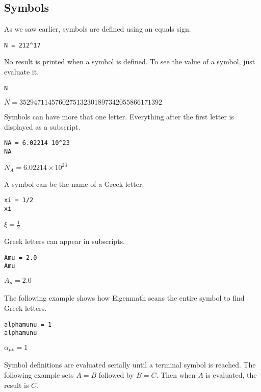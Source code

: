 \subsection{Symbols}

As we saw earlier, symbols are defined using an equals sign.

\begin{Verbatim}[formatcom=\color{blue}]
N = 212^17
\end{Verbatim}

\noindent
No result is printed when a symbol is defined.
To see the value of a symbol, just evaluate it.

\begin{Verbatim}[formatcom=\color{blue}]
N
\end{Verbatim}

\noindent
$\displaystyle N=3529471145760275132301897342055866171392$

\bigskip
\noindent
Symbols can have more that one letter.
Everything after the first letter is displayed as a subscript.

\begin{Verbatim}[formatcom=\color{blue}]
NA = 6.02214 10^23
NA
\end{Verbatim}

\noindent
$\displaystyle N_A=6.02214\times10^{23}$

\bigskip
\noindent
A symbol can be the name of a Greek letter.

\begin{Verbatim}[formatcom=\color{blue}]
xi = 1/2
xi
\end{Verbatim}

\noindent
$\displaystyle \xi=\tfrac{1}{2}$

\bigskip
\noindent
Greek letters can appear in subscripts.

\begin{Verbatim}[formatcom=\color{blue}]
Amu = 2.0
Amu
\end{Verbatim}

\noindent
$\displaystyle A_\mu=2.0$

\bigskip
\noindent
The following example shows how
Eigenmath scans the entire symbol to find Greek letters.

\begin{Verbatim}[formatcom=\color{blue}]
alphamunu = 1
alphamunu
\end{Verbatim}

\noindent
$\displaystyle \alpha_{\mu\nu}=1$

\bigskip
\noindent
Symbol definitions are evaluated serially until a terminal symbol is reached.
The following example sets $A=B$ followed by $B=C$.
Then when $A$ is evaluated, the result is $C$.

